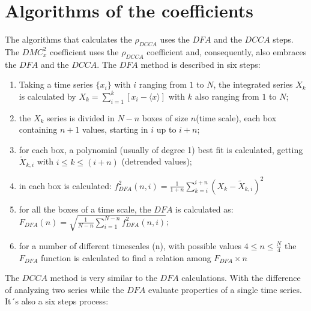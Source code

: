 \documentclass[article]{jss}
\begin{document}
\section{Algorithms of the coefficients}\label{sec:calculations}

The algorithms that calculates the $\rho_{DCCA}$ uses the $DFA$ and the $DCCA$ steps. The $DMC_x^2$ coefficient uses the $\rho_{DCCA}$ coefficient and, consequently, also embraces the $DFA$ and the $DCCA$. The $DFA$ method is described in six steps:


\begin{enumerate}\label{steps:dfa}

  \item Taking a time series \(\{x_{i}\}\) with \(i\) ranging from \(1\) to \(N\), the integrated series \(X_{k}\) is calculated by \(X_{k} = \sum_{i=1}^{k}\left[x_{i} - \langle x \rangle \right] \) with \(k\) also ranging from \(1\) to \(N\);
  \item the  \(X_{k}\) series is divided in \(N - n\) boxes of size \(n\)(time scale), each box containing \(n + 1\) values, starting in \(i\) up to \(i + n\);
  \item for each box, a polynomial (usually of degree 1) best fit is calculated, getting \(\widetilde{X}_{k, i}\) with \( i \le k \le (i + n) \) (detrended values);
  \item in each box is calculated: \(f_{DFA}^{2}(n, i) = \frac{1}{1+n} \sum_{k=i}^{i + n}(X_{k}-\widetilde{X}_{k, i})^{2}\)
  \item for all the boxes of a time scale, the $DFA$ is calculated as:\\[10pt]
        \(F_{DFA}(n) = \sqrt{\frac{1}{N - n} \sum_{i=1}^{N-n} f_{DFA}^{2}(n, i)}\);
  \item for a number of different timescales (n), with possible values \( 4 \le n \le \frac{N}{4}\) the \(F_{DFA}\) function is calculated to find a relation among \(F_{DFA} \times n\)

\end{enumerate}


The $DCCA$ method is very similar to the $DFA$ calculations. With the difference of analyzing two series while the $DFA$ evaluate properties of a single time series. It´s also a six steps process:
\end{document}
